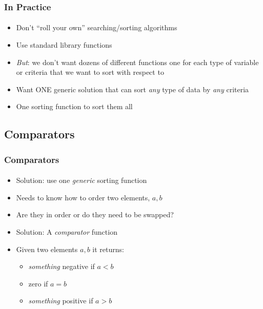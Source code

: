\documentclass[]{beamer}
\begin{document}
\begin{frame}[fragile]
  \frametitle{In Practice}
  \framesubtitle{}

\begin{itemize}[<+->]
  \item Don't ``roll your own'' searching/sorting algorithms
  \item Use standard library functions
  \item \emph{But}: we don't want dozens of different functions one for each type of variable or criteria that we want to sort with respect to
  \item Want ONE generic solution that can sort \emph{any} type of 
  data by \emph{any} criteria
  \item One sorting function to sort them all
\end{itemize}

\end{frame}

\subsection{Comparators}

\begin{frame}[fragile]
  \frametitle{Comparators}
  \framesubtitle{}

\begin{itemize}[<+->]
  \item Solution: use one \emph{generic} sorting function 
  \item Needs to know how to order two elements, $a, b$
  \item Are they in order or do they need to be swapped?
  \item Solution: A \emph{comparator} function
  \item Given two elements $a, b$ it returns:
  \begin{itemize}
     \item \emph{something} negative if $a < b$
     \item zero if $a=b$
     \item \emph{something} positive if $a>b$
  \end{itemize}
\end{itemize}

\end{frame}
\end{document}
